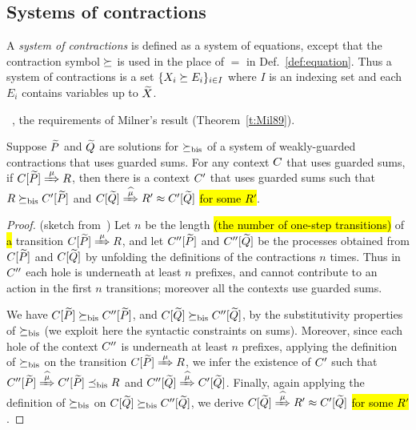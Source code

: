 \subsection{Systems of contractions}
\label{ss:SysContr}

A \emph{system of contractions} is defined as a system of equations,
except that the contraction symbol $\mathrel{\succeq}$ is used in the place of
$=$ in Def.~\ref{def:equation}. Thus a system of contractions is a set 
$\{  X_i \mathrel{\succeq} E_i\}_{i\in I}$ where $I$ is an indexing set and each
$E_i$  contains variables up to $\widetilde X$.

~\cite{sangiorgi2017equations},
 the requirements of Milner's result
(Theorem~\ref{t:Mil89}).

\begin{lemma}
\label{l:uptocon}
Suppose $\widetilde P$ and $\widetilde Q$ are solutions for $\mathrel{\succeq_{\rm{bis}}}$
 of a system of weakly-guarded contractions that uses 
guarded sums.
For any context $C$  that uses guarded sums,
if $\ct{\til P}\Arr{\mu}  R$, then there is a context $C'$  that uses 
guarded sums
such that $R \mathrel{\succeq_{\rm{bis}}} C' [\widetilde P]$ and $\ct{\til Q} \Arcap{\mu} R'
 \wb \ctp{\til Q}$ \hl{for some $R'$}.
\end{lemma}

\begin{proof}{(sketch from~\cite{sangiorgi2017equations})}
  Let $n$ be the length \hl{(the number of one-step transitions)} of
\hl{a} transition $\ct{\til P}\Arr\mu R$, and
let $C'' [\widetilde P]$ and $C'' [\widetilde Q]$  be the processes obtained
from  $C [\widetilde P]$ and $C [\widetilde Q]$ by unfolding the definitions
of the contractions $n$ times. Thus in $C''$ each hole is
underneath at least $n$ prefixes, and cannot contribute to an action
in the first $n$ transitions; moreover all the contexts use guarded sums.

We have $C [\widetilde P] \mathrel{\succeq_{\rm{bis}}} C'' [\widetilde P]$, and 
$C [\widetilde Q] \mathrel{\succeq_{\rm{bis}}} C'' [\widetilde Q]$, 
 by the substitutivity  properties of $\mathrel{\succeq_{\rm{bis}}}$ (we exploit here
 the syntactic constraints on sums). Moreover,
 since each hole of the  context $C''$ is underneath at least $n$
 prefixes, applying the definition
 of $ \mathrel{\succeq_{\rm{bis}}}$ on the transition 
 $\ct{\til P}\Arr{\mu}  R$, we infer the existence
 of $C'$ such that 
$\ctpp{\til P}\Arcap{\mu} \ctp{\til P} \mexpaBIS R$
and 
$\ctpp{\til Q}\Arcap{\mu}  \ctp{\til Q}$.
Finally, again applying the definition of $\mathrel{\succeq_{\rm{bis}}}$ on 
$C [\widetilde Q] \mathrel{\succeq_{\rm{bis}}} C'' [\widetilde Q]$, 
we derive 
$\ct{\til Q}\Arcap{\mu} R' \wb \ctp{\til Q}$ \hl{for some $R'$}.
\end{proof}


